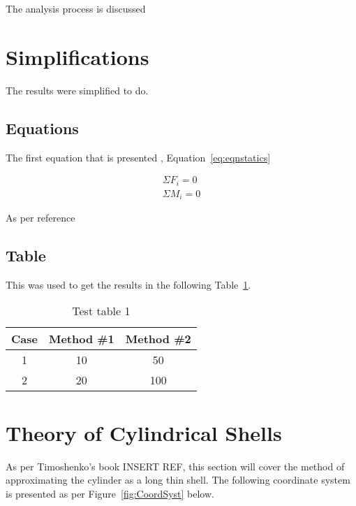 \label{chapt:prelim}

The analysis process is discussed

\section{Simplifications}

The results were simplified to do.

\subsection{Equations}


The first equation that is presented , Equation~\ref{eq:eqnstatics}

\begin{equation}
\label{eq:eqnstatics}
	\begin{aligned}
		\Sigma F_i=0\\
		\Sigma M_i=0
	\end{aligned}
\end{equation}


As per reference \cite{timoshenko1959theory}

\subsection{Table}

This was used to get the results in the following Table~\ref{table:testtbl}.
	
	\begin{table}[ht]
		\caption{Test table 1}
		\centering
		\begin{tabular}{c c c}
			\hline \hline  Case & Method \#1 & Method \#2 \\[0.5ex]
			\hline
			1 & 10 & 50\\
			2 & 20 & 100\\ [1ex]
			\hline
		\end{tabular}
		\label{table:testtbl}
	\end{table}

\section{Theory of Cylindrical Shells}%

As per Timoshenko's book INSERT REF, this section will cover the method of approximating the cylinder as a long thin shell. The following coordinate system is presented as per Figure~\ref{fig:CoordSyst} below.

